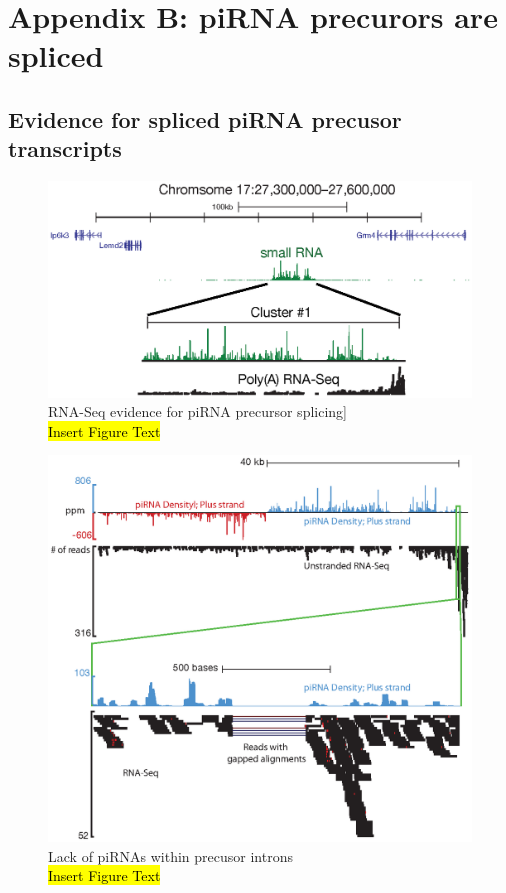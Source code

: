 \chapter{Appendix B: piRNA precurors are spliced} \label{AppendixB} 

\section{Evidence for spliced piRNA precusor transcripts}

\begin{figure}[htbp]
	\centering 
	\includegraphics{Figures/AppendixB/evidenceForPrecursorSplicing.eps}
	\caption[RNA-Seq evidence for piRNA precursor splicing]
	{
		RNA-Seq evidence for piRNA precursor splicing]\\
		\hl{Insert Figure Text}
	}
	\label{fig:evidence for precusor splicing}
\end{figure}

\begin{figure}[htbp]
	\centering 
	\includegraphics{Figures/AppendixB/noPiRNAswithinPrecusorIntrons.eps}
	\caption[Lack of piRNAs within precusor introns]
	{
		Lack of piRNAs within precusor introns\\
		\hl{Insert Figure Text}
	}
	\label{fig:Roy2014 SeqZip Diagram}
\end{figure}

